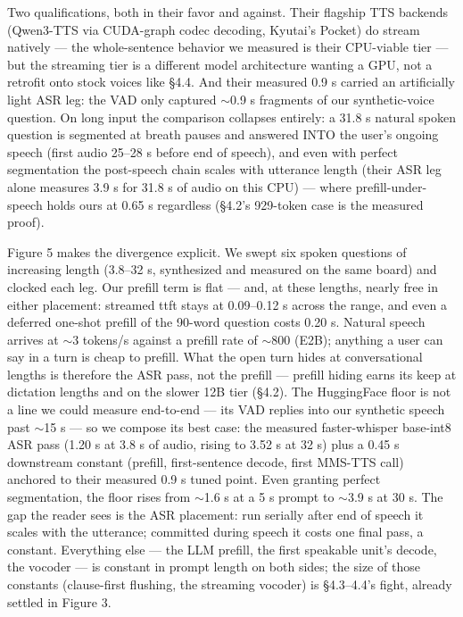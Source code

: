 \documentclass[journal]{IEEEtran}
\begin{document}
Two qualifications, both in their favor and against. Their flagship TTS backends (Qwen3-TTS via CUDA-graph codec decoding, Kyutai's Pocket) do stream natively — the whole-sentence behavior we measured is their CPU-viable tier — but the streaming tier is a different model architecture wanting a GPU, not a retrofit onto stock voices like §4.4. And their measured 0.9 s carried an artificially light ASR leg: the VAD only captured $\sim$0.9 s fragments of our synthetic-voice question. On long input the comparison collapses entirely: a 31.8 s natural spoken question is segmented at breath pauses and answered INTO the user's ongoing speech (first audio 25–28 s before end of speech), and even with perfect segmentation the post-speech chain scales with utterance length (their ASR leg alone measures 3.9 s for 31.8 s of audio on this CPU) — where prefill-under-speech holds ours at 0.65 s regardless (§4.2's 929-token case is the measured proof).

Figure 5 makes the divergence explicit. We swept six spoken questions of increasing length (3.8–32 s, synthesized and measured on the same board) and clocked each leg. Our prefill term is flat — and, at these lengths, nearly free in either placement: streamed ttft stays at 0.09–0.12 s across the range, and even a deferred one-shot prefill of the 90-word question costs 0.20 s. Natural speech arrives at $\sim$3 tokens/s against a prefill rate of $\sim$800 (E2B); anything a user can say in a turn is cheap to prefill. What the open turn hides at conversational lengths is therefore the ASR pass, not the prefill — prefill hiding earns its keep at dictation lengths and on the slower 12B tier (§4.2). The HuggingFace floor is not a line we could measure end-to-end — its VAD replies into our synthetic speech past $\sim$15 s — so we compose its best case: the measured faster-whisper base-int8 ASR pass (1.20 s at 3.8 s of audio, rising to 3.52 s at 32 s) plus a 0.45 s downstream constant (prefill, first-sentence decode, first MMS-TTS call) anchored to their measured 0.9 s tuned point. Even granting perfect segmentation, the floor rises from $\sim$1.6 s at a 5 s prompt to $\sim$3.9 s at 30 s. The gap the reader sees is the ASR placement: run serially after end of speech it scales with the utterance; committed during speech it costs one final pass, a constant. Everything else — the LLM prefill, the first speakable unit's decode, the vocoder — is constant in prompt length on both sides; the size of those constants (clause-first flushing, the streaming vocoder) is §4.3–4.4's fight, already settled in Figure 3.
\end{document}

